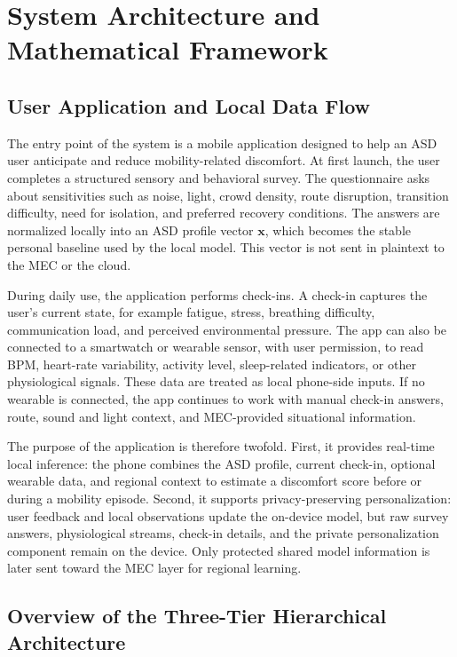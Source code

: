 \documentclass[lettersize,journal]{IEEEtran}
\begin{document}
\section{System Architecture and Mathematical Framework}
\label{sec:architecture}

\subsection{User Application and Local Data Flow}

The entry point of the system is a mobile application designed to help
an ASD user anticipate and reduce mobility-related discomfort. At first
launch, the user completes a structured sensory and behavioral survey.
The questionnaire asks about sensitivities such as noise, light, crowd
density, route disruption, transition difficulty, need for isolation,
and preferred recovery conditions. The answers are normalized locally
into an ASD profile vector $\mathbf{x}$, which becomes the stable
personal baseline used by the local model. This vector is not sent in
plaintext to the MEC or the cloud.

During daily use, the application performs check-ins. A check-in
captures the user's current state, for example fatigue, stress,
breathing difficulty, communication load, and perceived environmental
pressure. The app can also be connected to a smartwatch or wearable
sensor, with user permission, to read BPM, heart-rate variability,
activity level, sleep-related indicators, or other physiological
signals. These data are treated as local phone-side inputs. If no
wearable is connected, the app continues to work with manual check-in
answers, route, sound and light context, and MEC-provided situational information.

The purpose of the application is therefore twofold. First, it provides
real-time local inference: the phone combines the ASD profile, current
check-in, optional wearable data, and regional context to estimate a
discomfort score before or during a mobility episode. Second, it
supports privacy-preserving personalization: user feedback and local
observations update the on-device model, but raw survey answers,
physiological streams, check-in details, and the private personalization
component remain on the device. Only protected shared model information
is later sent toward the MEC layer for regional learning.

\subsection{Overview of the Three-Tier Hierarchical Architecture}
\end{document}

